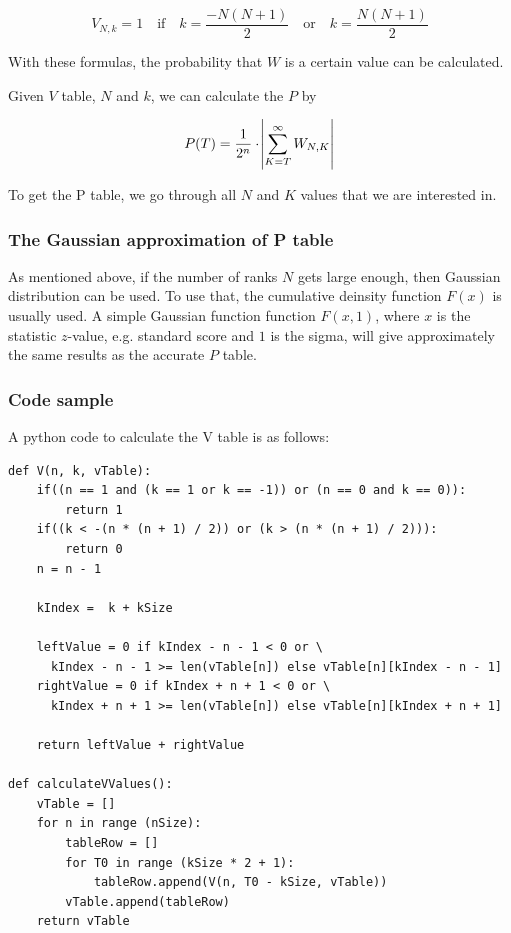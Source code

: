 \documentclass[12pt]{article}
\begin{document}
\begin{equation}
V_{N, k} = 1 \quad\text{if}\quad k =  \frac{ -N(N+1)}{2} \quad\text{or}\quad k =  \frac{N(N+1)}{2}
\end{equation}

With these formulas, the probability that $W$ is a certain value can be calculated.

Given $V$ table, $N$ and $k$, we can calculate the $P$ by

\begin{equation}
P(T) = \frac{1}{2^n} \cdot \abs{\sum\limits_{K=T}^{\infty}{W_{N,K}}}
\end{equation}

To get the P table, we go through all $N$ and $K$ values that we are interested in.

\subsubsection{The Gaussian approximation of P table}
As mentioned above, if the number of ranks $N$ gets large enough, then Gaussian distribution can be used. To use that, the cumulative deinsity function $F(x)$ is usually used. A simple Gaussian function function $F(x, 1)$, where $x$ is the statistic $z$-value, e.g. standard score and $1$ is the sigma, will give approximately the same results as the accurate $P$ table.

\subsubsection{Code sample}
A python code to calculate the V table is as follows:
\begin{verbatim}
def V(n, k, vTable):
    if((n == 1 and (k == 1 or k == -1)) or (n == 0 and k == 0)):
        return 1
    if((k < -(n * (n + 1) / 2)) or (k > (n * (n + 1) / 2))):
        return 0
    n = n - 1

    kIndex =  k + kSize

    leftValue = 0 if kIndex - n - 1 < 0 or \
      kIndex - n - 1 >= len(vTable[n]) else vTable[n][kIndex - n - 1]
    rightValue = 0 if kIndex + n + 1 < 0 or \
      kIndex + n + 1 >= len(vTable[n]) else vTable[n][kIndex + n + 1]

    return leftValue + rightValue

def calculateVValues():
    vTable = []
    for n in range (nSize):
        tableRow = []
        for T0 in range (kSize * 2 + 1):
            tableRow.append(V(n, T0 - kSize, vTable))
        vTable.append(tableRow)
    return vTable

\end{verbatim}
\end{document}
